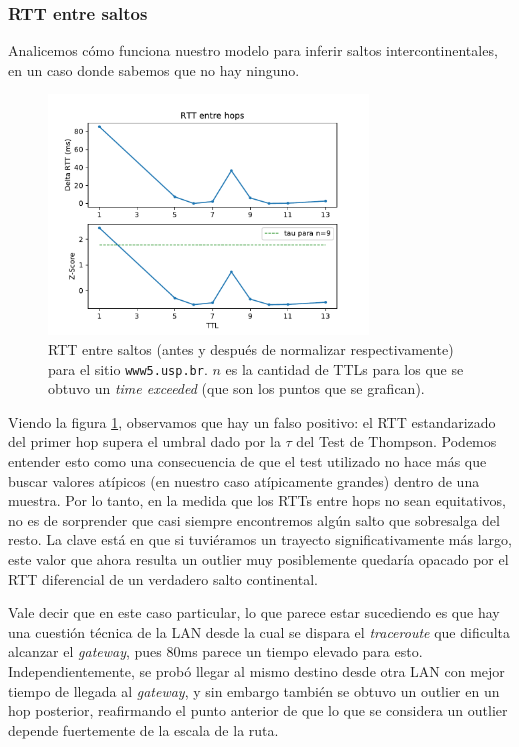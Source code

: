 \subsubsection*{RTT entre saltos}

Analicemos cómo funciona nuestro modelo para inferir saltos intercontinentales, en un caso donde sabemos que no hay ninguno.

\begin{figure}[H]
  \centering
  \includegraphics[width=8.5cm]{figs/traceroute-saopaulo.pdf}
  \caption{\footnotesize RTT entre saltos (antes y después de normalizar respectivamente) para el sitio \texttt{www5.usp.br}. $n$ es la cantidad de TTLs para los que se obtuvo un \emph{time exceeded} (que son los puntos que se grafican).}
  \label{plot-saopaulo}
\end{figure}

Viendo la figura \ref{plot-saopaulo}, observamos que hay un falso positivo: el RTT estandarizado del primer hop supera el umbral dado por la $\tau$ del Test de Thompson. Podemos entender esto como una consecuencia de que el test utilizado no hace más que buscar valores atípicos (en nuestro caso atípicamente grandes) dentro de una muestra. Por lo tanto, en la medida que los RTTs entre hops no sean equitativos, no es de sorprender que casi siempre encontremos algún salto que sobresalga del resto. La clave está en que si tuviéramos un trayecto significativamente más largo, este valor que ahora resulta un outlier muy posiblemente quedaría opacado por el RTT diferencial de un verdadero salto continental.

Vale decir que en este caso particular, lo que parece estar sucediendo es que hay una cuestión técnica de la LAN desde la cual se dispara el \emph{traceroute} que dificulta alcanzar el \emph{gateway}, pues 80ms parece un tiempo elevado para esto. Independientemente, se probó llegar al mismo destino desde otra LAN con mejor tiempo de llegada al \emph{gateway}, y sin embargo también se obtuvo un outlier en un hop posterior, reafirmando el punto anterior de que lo que se considera un outlier depende fuertemente de la escala de la ruta. 

